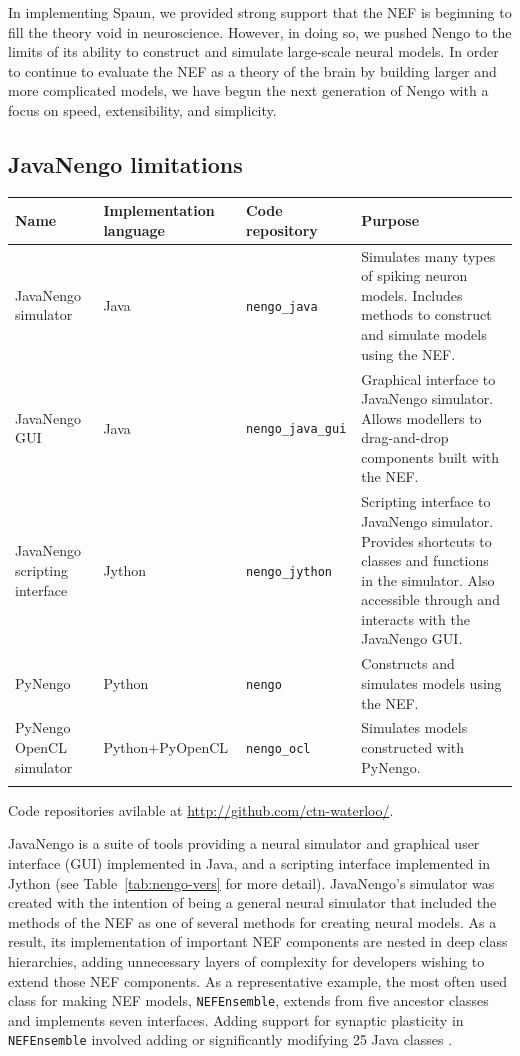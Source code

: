 \documentclass{frontiersSCNS}
\begin{document}
In implementing Spaun,
we provided strong support
that the NEF is beginning to fill the theory void in neuroscience.
However, in doing so, we pushed Nengo
to the limits of its ability to construct and simulate
large-scale neural models.
In order to continue to evaluate the NEF
as a theory of the brain
by building larger and more complicated models,
we have begun the next generation
of Nengo with a focus on speed,
extensibility, and simplicity.

\subsection{JavaNengo limitations}

\begin{table}[!t]
{\begin{tabular}{p{2.6cm} p{2.7cm} l p{7cm}} \toprule
\textbf{Name} & \textbf{Implementation language}
  & \textbf{Code repository} & \textbf{Purpose} \\\midrule
JavaNengo simulator & Java & \texttt{nengo\_java}
  & Simulates many types of spiking neuron models.
  Includes methods to construct and simulate models using the NEF. \\
JavaNengo GUI & Java & \texttt{nengo\_java\_gui}
  & Graphical interface to JavaNengo simulator.
  Allows modellers to drag-and-drop components built with the NEF. \\
JavaNengo scripting interface & Jython & \texttt{nengo\_jython}
  & Scripting interface to JavaNengo simulator.
  Provides shortcuts to classes and functions in the simulator.
  Also accessible through and interacts with the JavaNengo GUI. \\
PyNengo & Python & \texttt{nengo}
  & Constructs and simulates models using the NEF. \\
PyNengo OpenCL simulator & Python+PyOpenCL
  & \texttt{nengo\_ocl}
  & Simulates models constructed with PyNengo. \\\botrule
\end{tabular}}{Code repositories avilable at \url{http://github.com/ctn-waterloo/}.}
\end{table}

JavaNengo is a suite of tools providing
a neural simulator and graphical user interface (GUI)
implemented in Java,
and a scripting interface implemented in Jython
(see Table~\ref{tab:nengo-vers} for more detail).
JavaNengo's simulator was created
with the intention of being a general
neural simulator that included
the methods of the NEF
as one of several
methods for creating neural models.
As a result, its implementation
of important NEF components
are nested in deep class hierarchies,
adding unnecessary layers of complexity
for developers wishing
to extend those NEF components.
As a representative example,
the most often used class for making
NEF models, \texttt{NEFEnsemble},
extends from five ancestor classes
and implements seven interfaces.
Adding support for synaptic plasticity
in \texttt{NEFEnsemble}
involved adding or significantly modifying
25 Java classes \cite{TODO}.
\end{document}
